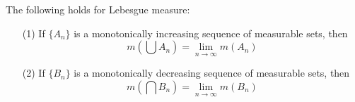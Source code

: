 \begin{theorem}\label{8.4.3}
    The following holds for Lebesgue measure:
    \begin{enumerate}
        \item[(1)] If $\{A_n\}$ is a monotonically increasing sequence of
            measurable sets, then
            \begin{equation*}
                m(\bigcup{A_n})=\lim_{n \xrightarrow{} \infty}{m(A_n)}
            \end{equation*}

        \item[(2)] If $\{B_n\}$ is a monotonically decreasing sequence of
            measurable sets, then
            \begin{equation*}
                m(\bigcap{B_n})=\lim_{n \xrightarrow{} \infty}{m(B_n)}
            \end{equation*}
    \end{enumerate}
\end{theorem}
